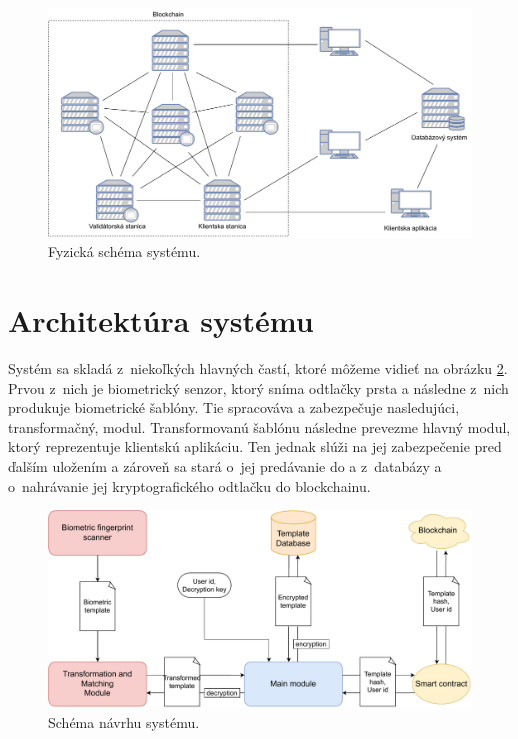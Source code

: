 \begin{figure}[hbt]
	\centering
	\includegraphics[width=\textwidth]{obrazky-figures/physical_sys.pdf}
	\caption{Fyzická schéma systému.}
	\label{pic_system_physical}
\end{figure}

\section{Architektúra systému}
Systém sa skladá z~niekoľkých hlavných častí, ktoré môžeme vidieť na obrázku \ref{pic_navrh}. Prvou z~nich je biometrický senzor, ktorý sníma odtlačky prsta a následne z~nich produkuje biometrické šablóny. Tie spracováva a zabezpečuje nasledujúci, transformačný, modul. Transformovanú šablónu následne prevezme hlavný modul, ktorý reprezentuje klientskú aplikáciu. Ten jednak slúži na jej zabezpečenie pred ďalším uložením a zároveň sa stará o~jej predávanie do a z~databázy a o~nahrávanie jej kryptografického odtlačku do blockchainu.

\begin{figure}[hbt]
	\centering
	\includegraphics[width=\textwidth]{obrazky-figures/navrh.pdf}
	\caption{Schéma návrhu systému.}
	\label{pic_navrh}
\end{figure}

